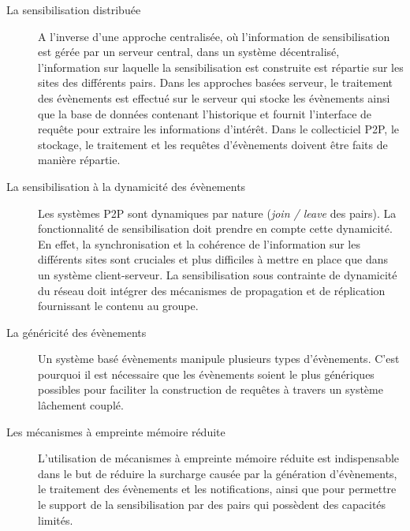 \begin{description}
	\item[La sensibilisation distribuée] A l'inverse d'une approche centralisée, où 
	l'information de sensibilisation est gérée par un serveur central, dans un 
	système décentralisé, l'information sur laquelle la sensibilisation est construite 
	est répartie sur les sites des différents pairs. Dans les approches basées 
	serveur, le traitement des évènements est effectué sur le serveur qui stocke 
	les évènements ainsi que la base de données contenant l'historique et fournit 
	l'interface de requête pour extraire les informations d'intérêt. Dans le collecticiel 
	\gls{P2P}, le stockage, le traitement et les requêtes d'évènements doivent être faits 
	de manière répartie.
	
	\item[La sensibilisation à la dynamicité des évènements] Les systèmes \gls{P2P} 
	sont dynamiques par nature (\textit{join / leave} des pairs). La fonctionnalité de 
	sensibilisation doit prendre en compte cette dynamicité. En effet, la 
	synchronisation et la cohérence de l'information sur les différents sites sont 
	cruciales et plus difficiles à mettre en place que dans un système 
	client-serveur. La sensibilisation sous contrainte de dynamicité du réseau doit 
	intégrer des mécanismes de propagation et de réplication fournissant le contenu 
	au groupe. 
	
	\item[La généricité des évènements] Un système basé évènements manipule 
	plusieurs types d'évènements. C'est pourquoi il est nécessaire que les 
	évènements soient le plus génériques possibles pour faciliter la construction de 
	requêtes à travers un système lâchement couplé.
	
	\item[Les mécanismes à empreinte mémoire réduite] L'utilisation de 
	mécanismes à empreinte mémoire réduite est indispensable dans le but de 
	réduire la surcharge causée par la génération d'évènements, le traitement des 
	évènements et les notifications, ainsi que pour permettre le support de la 
	sensibilisation par des pairs qui possèdent des capacités limités.

\end{description}
